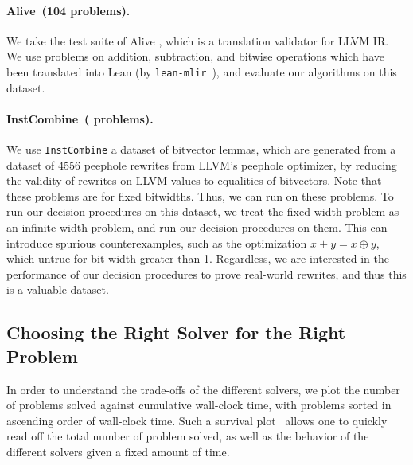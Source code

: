 \noindent \paragraph{Alive~(104 problems).} We take the test suite of Alive \cite{lopes2015provably}, which is a translation validator for LLVM IR.
We use problems on addition, subtraction, and bitwise operations which have been translated into Lean (by \texttt{lean-mlir}~\cite{bhat2024verifying}),
and evaluate our algorithms on this dataset.
\noindent \paragraph{InstCombine~(\InstCombineTotalProblems{} problems).}
We use \texttt{InstCombine} a dataset of \InstCombineTotalProblems{} bitvector
lemmas, which are
generated from a dataset of 4556 peephole rewrites from LLVM's peephole optimizer, by
reducing the validity of rewrites on LLVM values to equalities of bitvectors.
%
Note that these problems are for fixed bitwidths.
%
Thus, we can run \bvdecide{} on these problems. To run our decision procedures on this dataset,
we treat the fixed width problem as an infinite width problem, and run our decision procedures on them.
This can introduce spurious counterexamples, such as the optimization $x + y = x \oplus y$, which untrue for bit-width greater than 1.
Regardless, we are interested in the performance of our decision procedures to prove real-world rewrites,
and thus this is a valuable dataset.

\subsection{Choosing the Right Solver for the Right Problem}

In order to understand the trade-offs of the different solvers,
we plot the number of problems solved against cumulative wall-clock time,
with problems sorted in ascending order of wall-clock time.
Such a survival plot~\cite{brain2017benchmarking} allows one to quickly read off the total number of problem solved,
as well as the behavior of the different solvers given a fixed amount of time.


